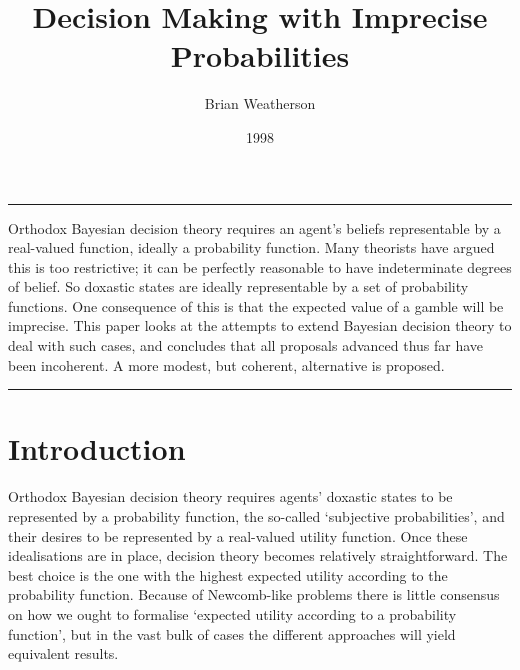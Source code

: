 \documentclass[
  10pt,
  letterpaper,
  DIV=11,
  numbers=noendperiod,
  twoside]{scrartcl}
\title{Decision Making with Imprecise Probabilities}
\author{Brian Weatherson}
\date{1998}
\renewenvironment{abstract}
 {\vspace{-1.25cm}
 \quotation\small\noindent\rule{\linewidth}{.5pt}\par\smallskip
 \noindent }
 {\par\noindent\rule{\linewidth}{.5pt}\endquotation}
\begin{document}
\maketitle
\begin{abstract}
Orthodox Bayesian decision theory requires an agent's beliefs
representable by a real-valued function, ideally a probability function.
Many theorists have argued this is too restrictive; it can be perfectly
reasonable to have indeterminate degrees of belief. So doxastic states
are ideally representable by a set of probability functions. One
consequence of this is that the expected value of a gamble will be
imprecise. This paper looks at the attempts to extend Bayesian decision
theory to deal with such cases, and concludes that all proposals
advanced thus far have been incoherent. A more modest, but coherent,
alternative is proposed.
\end{abstract}


\section{Introduction}\label{introduction}

Orthodox Bayesian decision theory requires agents' doxastic states to be
represented by a probability function, the so-called `subjective
probabilities', and their desires to be represented by a real-valued
utility function. Once these idealisations are in place, decision theory
becomes relatively straightforward. The best choice is the one with the
highest expected utility according to the probability function. Because
of Newcomb-like problems there is little consensus on how we ought to
formalise `expected utility according to a probability function', but in
the vast bulk of cases the different approaches will yield equivalent
results.
\end{document}
